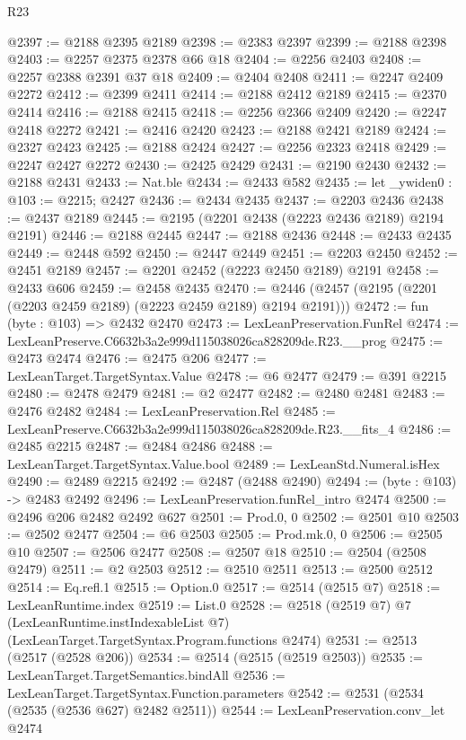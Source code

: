 \begin{lexlean}{R23}
\begin{coremodule}
@2397 := @2188 @2395 @2189
@2398 := @2383 @2397
@2399 := @2188 @2398
@2403 := @2257 @2375 @2378 @66 @18
@2404 := @2256 @2403
@2408 := @2257 @2388 @2391 @37 @18
@2409 := @2404 @2408
@2411 := @2247 @2409 @2272
@2412 := @2399 @2411
@2414 := @2188 @2412 @2189
@2415 := @2370 @2414
@2416 := @2188 @2415
@2418 := @2256 @2366 @2409
@2420 := @2247 @2418 @2272
@2421 := @2416 @2420
@2423 := @2188 @2421 @2189
@2424 := @2327 @2423
@2425 := @2188 @2424
@2427 := @2256 @2323 @2418
@2429 := @2247 @2427 @2272
@2430 := @2425 @2429
@2431 := @2190 @2430
@2432 := @2188 @2431
@2433 := Nat.ble
@2434 := @2433 @582
@2435 := let _ywiden0 : @103 := @2215; @2427
@2436 := @2434 @2435
@2437 := @2203 @2436
@2438 := @2437 @2189
@2445 := @2195 (@2201 @2438 (@2223 @2436 @2189) @2194 @2191)
@2446 := @2188 @2445
@2447 := @2188 @2436
@2448 := @2433 @2435
@2449 := @2448 @592
@2450 := @2447 @2449
@2451 := @2203 @2450
@2452 := @2451 @2189
@2457 := @2201 @2452 (@2223 @2450 @2189) @2191
@2458 := @2433 @606
@2459 := @2458 @2435
@2470 := @2446 (@2457 (@2195 (@2201 (@2203 @2459 @2189) (@2223 @2459 @2189) @2194 @2191)))
@2472 := fun (byte : @103) => @2432 @2470
@2473 := LexLeanPreservation.FunRel
@2474 := LexLeanPreserve.C6632b3a2e999d115038026ca828209de.R23.__prog
@2475 := @2473 @2474
@2476 := @2475 @206
@2477 := LexLeanTarget.TargetSyntax.Value
@2478 := @6 @2477
@2479 := @391 @2215
@2480 := @2478 @2479
@2481 := @2 @2477
@2482 := @2480 @2481
@2483 := @2476 @2482
@2484 := LexLeanPreservation.Rel
@2485 := LexLeanPreserve.C6632b3a2e999d115038026ca828209de.R23.__fits_4
@2486 := @2485 @2215
@2487 := @2484 @2486
@2488 := LexLeanTarget.TargetSyntax.Value.bool
@2489 := LexLeanStd.Numeral.isHex
@2490 := @2489 @2215
@2492 := @2487 (@2488 @2490)
@2494 := (byte : @103) -> @2483 @2492
@2496 := LexLeanPreservation.funRel_intro @2474
@2500 := @2496 @206 @2482 @2492 @627
@2501 := Prod.{0, 0}
@2502 := @2501 @10
@2503 := @2502 @2477
@2504 := @6 @2503
@2505 := Prod.mk.{0, 0}
@2506 := @2505 @10
@2507 := @2506 @2477
@2508 := @2507 @18
@2510 := @2504 (@2508 @2479)
@2511 := @2 @2503
@2512 := @2510 @2511
@2513 := @2500 @2512
@2514 := Eq.refl.{1}
@2515 := Option.{0}
@2517 := @2514 (@2515 @7)
@2518 := LexLeanRuntime.index
@2519 := List.{0}
@2528 := @2518
    (@2519 @7)
    @7
    (LexLeanRuntime.instIndexableList @7)
    (LexLeanTarget.TargetSyntax.Program.functions @2474)
@2531 := @2513 (@2517 (@2528 @206))
@2534 := @2514 (@2515 (@2519 @2503))
@2535 := LexLeanTarget.TargetSemantics.bindAll
@2536 := LexLeanTarget.TargetSyntax.Function.parameters
@2542 := @2531 (@2534 (@2535 (@2536 @627) @2482 @2511))
@2544 := LexLeanPreservation.conv_let @2474

\end{coremodule}
\end{lexlean}
